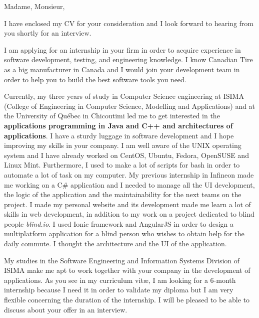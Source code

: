 \date{\today}
\opening{Madame, Monsieur,}
\closing{I have enclosed my CV for your consideration and I look forward to hearing from you shortly for an interview.}

\makelettertitle

I am applying for an internship in your firm in order to acquire experience in software development, testing, and engineering knowledge. I know Canadian Tire as a big manufacturer in Canada and I would join your development team in order to help you to build the best software tools you need.

Currently, my three years of study in Computer Science engineering at ISIMA (College of Engineering in Computer Science, Modelling and Applications) and at the University of Québec in Chicoutimi led me to get interested in the \textbf{applications programming in Java and C++ and architectures of applications}. I have a sturdy luggage in software development and I hope improving my skills in your company. I am well aware of the UNIX operating system and I have already worked on CentOS, Ubuntu, Fedora, OpenSUSE and Linux Mint. Furthermore, I used to make a lot of scripts for bash in order to automate a lot of task on my computer. My previous internship in Infineon made me working on a C\# application and I needed to manage all the UI development, the logic of the application and the maintainability for the next teams on the project. I made my personal website and its development made me learn a lot of skills in web development, in addition to my work on a project dedicated to blind people \textit{blind.io}. I used Ionic framework and AngularJS in order to design a multiplatform application for a blind person who wishes to obtain help for the daily commute. I thought the architecture and the UI of the application.

My studies in the Software Engineering and Information Systems Division of ISIMA make me apt to work together with your company in the development of applications. As you see in my curriculum vit\ae{}, I am looking for a 6-month internship because I need it in order to validate my diploma but I am very flexible concerning the duration of the internship. I will be pleased to be able to discuss about your offer in an interview.

\makeletterclosing
